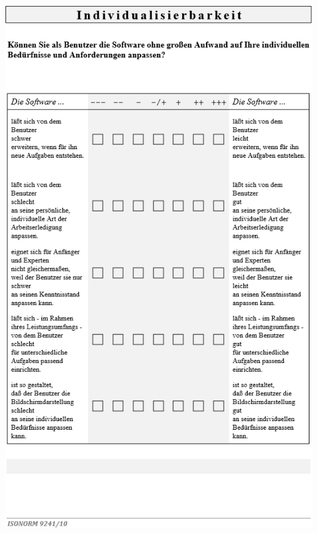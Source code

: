 \bigskip\noindent
\begin{minipage}{\textwidth}
  \centering
  \includegraphics{img/ISO9241-10Fragebogen_S6.PNG}
\end{minipage}

